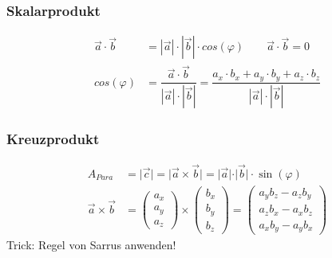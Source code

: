     \subsubsection{Skalarprodukt}
    \begin{align*}
        \vec{a} \cdot \vec{b} & = |\vec{a}| \cdot |\vec{b}| \cdot cos(\varphi) \qquad \vec{a} \cdot \vec{b}  = 0\\
        cos(\varphi)          &  = \dfrac{\vec{a} \cdot \vec{b}}{|\vec{a}| \cdot |\vec{b}|} = \dfrac{a_x \cdot b_x + a_y \cdot b_y + a_z \cdot b_z}{|\vec{a}| \cdot |\vec{b}|}
    \end{align*}

    \subsubsection{Kreuzprodukt}
    
    \begingroup
        \renewcommand*{\arraystretch}{.95}
        \begin{align*}
        A_{Para} & = \vert \vec{c} \vert = \vert \vec{a} \times \vec{b} \vert = \vert \vec{a} \vert \cdot \vert \vec{b} \vert \cdot \sin(\varphi)\\
        \vec{a}\times\vec{b} & =
                \begin{pmatrix}
                    a_x \\
                    a_y \\
                    a_z
                \end{pmatrix}
                \times
                \begin{pmatrix}
                    b_x \\
                    b_y \\
                    b_z
                \end{pmatrix} =
                \begin{pmatrix}
                    a_yb_z-a_zb_y \\
                    a_zb_x-a_xb_z \\
                    a_xb_y-a_yb_x
                \end{pmatrix}
            \end{align*}
    \endgroup
    Trick: Regel von Sarrus anwenden!
    
